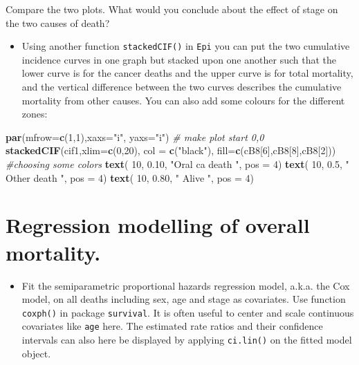 \documentclass[
]{book}
\newenvironment{Shaded}{\begin{snugshade}}{\end{snugshade}}
\newcommand{\AttributeTok}[1]{\textcolor[rgb]{0.13,0.29,0.53}{#1}}
\newcommand{\CommentTok}[1]{\textcolor[rgb]{0.56,0.35,0.01}{\textit{#1}}}
\newcommand{\DecValTok}[1]{\textcolor[rgb]{0.00,0.00,0.81}{#1}}
\newcommand{\FloatTok}[1]{\textcolor[rgb]{0.00,0.00,0.81}{#1}}
\newcommand{\FunctionTok}[1]{\textcolor[rgb]{0.13,0.29,0.53}{\textbf{#1}}}
\newcommand{\NormalTok}[1]{#1}
\newcommand{\StringTok}[1]{\textcolor[rgb]{0.31,0.60,0.02}{#1}}
\providecommand{\tightlist}{%
  \setlength{\itemsep}{0pt}\setlength{\parskip}{0pt}}
\begin{document}
Compare the two plots. What would you conclude about the
effect of stage on the two causes of death?

\begin{itemize}
\tightlist
\item
  Using another function \texttt{stackedCIF()} in \texttt{Epi} you can
  put the two cumulative incidence curves in one graph but stacked upon one another such that
  the lower curve is for the cancer deaths and the upper curve is for total mortality,
  and the vertical difference between the two curves describes the
  cumulative mortality from other causes. You can also add some colours for the different zones:
\end{itemize}

\begin{Shaded}
\begin{Highlighting}[]
\FunctionTok{par}\NormalTok{(}\AttributeTok{mfrow=}\FunctionTok{c}\NormalTok{(}\DecValTok{1}\NormalTok{,}\DecValTok{1}\NormalTok{),}\AttributeTok{xaxs=}\StringTok{"i"}\NormalTok{, }\AttributeTok{yaxs=}\StringTok{"i"}\NormalTok{) }\CommentTok{\# make plot start 0,0}
\FunctionTok{stackedCIF}\NormalTok{(cif1,}\AttributeTok{xlim=}\FunctionTok{c}\NormalTok{(}\DecValTok{0}\NormalTok{,}\DecValTok{20}\NormalTok{),}
           \AttributeTok{col =} \FunctionTok{c}\NormalTok{(}\StringTok{"black"}\NormalTok{),}
           \AttributeTok{fill=}\FunctionTok{c}\NormalTok{(cB8[}\DecValTok{6}\NormalTok{],cB8[}\DecValTok{8}\NormalTok{],cB8[}\DecValTok{2}\NormalTok{])) }\CommentTok{\#choosing some colors }
\FunctionTok{text}\NormalTok{( }\DecValTok{10}\NormalTok{, }\FloatTok{0.10}\NormalTok{, }\StringTok{"Oral ca death "}\NormalTok{, }\AttributeTok{pos =} \DecValTok{4}\NormalTok{)}
\FunctionTok{text}\NormalTok{( }\DecValTok{10}\NormalTok{, }\FloatTok{0.5}\NormalTok{, }\StringTok{" Other death "}\NormalTok{, }\AttributeTok{pos =} \DecValTok{4}\NormalTok{)}
\FunctionTok{text}\NormalTok{( }\DecValTok{10}\NormalTok{, }\FloatTok{0.80}\NormalTok{, }\StringTok{" Alive "}\NormalTok{, }\AttributeTok{pos =} \DecValTok{4}\NormalTok{)}
\end{Highlighting}
\end{Shaded}

\section{Regression modelling of overall mortality.}\label{regression-modelling-of-overall-mortality.}

\begin{itemize}
\tightlist
\item
  Fit the semiparametric proportional hazards
  regression model, a.k.a. the Cox model, on all deaths including
  sex, age and stage as covariates. Use function
  \texttt{coxph()} in package \texttt{survival}.
  It is often useful to center and scale
  continuous covariates like \texttt{age} here.
  The estimated rate ratios and their confidence intervals
  can also here be displayed by applying \texttt{ci.lin()}
  on the fitted model object.
\end{itemize}
\end{document}
